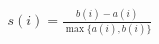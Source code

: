 \documentclass[10pt]{article}
\begin{document}
\begin{align*}s(i)={\frac{b(i)-a(i)}{\max\{a(i),b(i)\}}}\end{align*}
\end{document}

